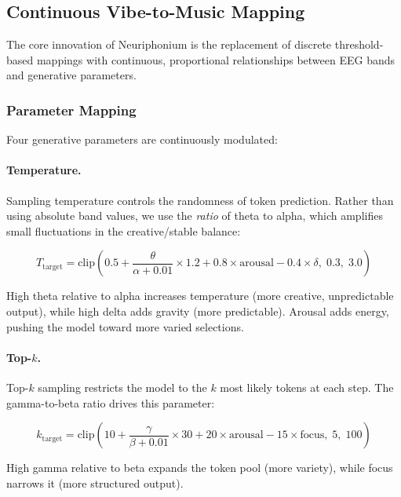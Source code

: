\documentclass[manuscript,review,anonymous]{acmart}
\begin{document}
\subsection{Continuous Vibe-to-Music Mapping}

The core innovation of Neuriphonium is the replacement of discrete threshold-based mappings with continuous, proportional relationships between EEG bands and generative parameters.

\subsubsection{Parameter Mapping}

Four generative parameters are continuously modulated:

\paragraph{Temperature.}
Sampling temperature controls the randomness of token prediction. Rather than using absolute band values, we use the \emph{ratio} of theta to alpha, which amplifies small fluctuations in the creative/stable balance:

\begin{equation}
  T_{\text{target}} = \text{clip}\left(0.5 + \frac{\theta}{\alpha + 0.01} \times 1.2 + 0.8 \times \text{arousal} - 0.4 \times \delta, \; 0.3, \; 3.0\right)
\end{equation}

High theta relative to alpha increases temperature (more creative, unpredictable output), while high delta adds gravity (more predictable). Arousal adds energy, pushing the model toward more varied selections.

\paragraph{Top-$k$.}
Top-$k$ sampling restricts the model to the $k$ most likely tokens at each step. The gamma-to-beta ratio drives this parameter:

\begin{equation}
  k_{\text{target}} = \text{clip}\left(10 + \frac{\gamma}{\beta + 0.01} \times 30 + 20 \times \text{arousal} - 15 \times \text{focus}, \; 5, \; 100\right)
\end{equation}

High gamma relative to beta expands the token pool (more variety), while focus narrows it (more structured output).
\end{document}
